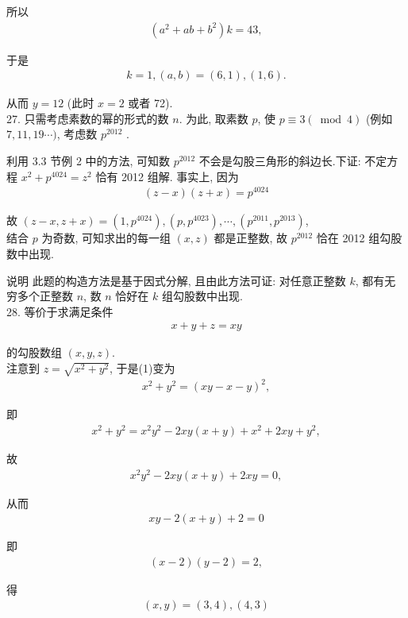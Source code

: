 所以
\begin{align*}
	\left(a^{2}+a b+b^{2}\right) k=43,
\end{align*}

于是
\begin{align*}
	k=1,(a, b)=(6,1),(1,6) .
\end{align*}

从而 $y=12$ (此时 $x=2$ 或者 72).\\
27. 只需考虑素数的幂的形式的数 $n$. 为此, 取素数 $p$, 使 $p \equiv 3(\bmod 4)$ (例如 $7,11,19 \cdots)$, 考虑数 $p^{2012}$ .

利用 3.3 节例 2 中的方法, 可知数 $p^{2012}$ 不会是勾股三角形的斜边长.下证: 不定方程 $x^{2}+p^{4024}=z^{2}$ 恰有 2012 组解. 事实上, 因为
\begin{align*}
	(z-x)(z+x)=p^{4024}
\end{align*}

故 $(z-x, z+x)=\left(1, p^{4024}\right),\left(p, p^{4023}\right), \cdots,\left(p^{2011}, p^{2013}\right)$,\\
结合 $p$ 为奇数, 可知求出的每一组 $(x, z)$ 都是正整数, 故 $p^{2012}$ 恰在 2012 组勾股数中出现.

说明 此题的构造方法是基于因式分解, 且由此方法可证: 对任意正整数 $k$, 都有无穷多个正整数 $n$, 数 $n$ 恰好在 $k$ 组勾股数中出现.\\
28. 等价于求满足条件
\begin{align*}
	x+y+z=x y
\end{align*}

的勾股数组 $(x, y, z)$.\\
注意到 $z=\sqrt{x^{2}+y^{2}}$, 于是(1)变为
\begin{align*}
	x^{2}+y^{2}=(x y-x-y)^{2},
\end{align*}

即
\begin{align*}
	x^{2}+y^{2}=x^{2} y^{2}-2 x y(x+y)+x^{2}+2 x y+y^{2},
\end{align*}

故
\begin{align*}
	x^{2} y^{2}-2 x y(x+y)+2 x y=0,
\end{align*}

从而
\begin{align*}
	x y-2(x+y)+2=0
\end{align*}

即
\begin{align*}
	(x-2)(y-2)=2,
\end{align*}

得
\begin{align*}
	(x, y)=(3,4),(4,3)
\end{align*}

